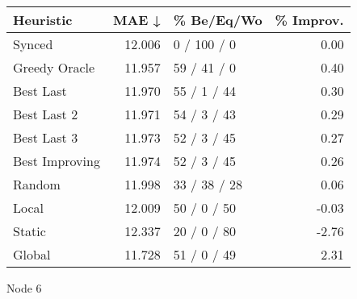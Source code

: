 \begin{tabular}{lrlr}
\toprule
\textbf{Heuristic} & \textbf{MAE ↓} & \textbf{\% Be/Eq/Wo} & \textbf{\% Improv.} \\
\midrule
            Synced &         12.006 &          0 / 100 / 0 &                0.00 \\
     Greedy Oracle &         11.957 &          59 / 41 / 0 &                0.40 \\
         Best Last &         11.970 &          55 / 1 / 44 &                0.30 \\
       Best Last 2 &         11.971 &          54 / 3 / 43 &                0.29 \\
       Best Last 3 &         11.973 &          52 / 3 / 45 &                0.27 \\
    Best Improving &         11.974 &          52 / 3 / 45 &                0.26 \\
            Random &         11.998 &         33 / 38 / 28 &                0.06 \\
             Local &         12.009 &          50 / 0 / 50 &               -0.03 \\
            Static &         12.337 &          20 / 0 / 80 &               -2.76 \\
            Global &         11.728 &          51 / 0 / 49 &                2.31 \\
\bottomrule
\end{tabular}
\caption{Node 6}
\label{tab:ds_iid_lr01_le1_bs2_6}
